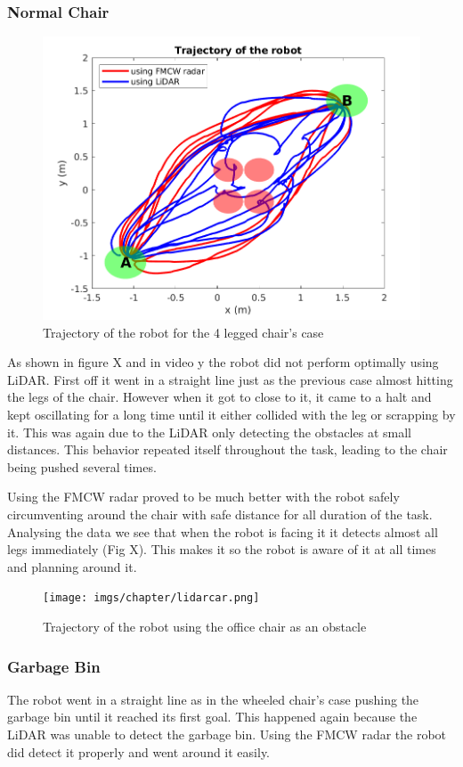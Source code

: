 \subsubsection{Normal Chair}
\begin{figure}
\centerline{\includegraphics [width=0.7 \textwidth]{imgs/chapter5/traj2.png}}
\caption{Trajectory of the robot for the 4 legged chair's case}
\label{fig:turlebot2}
\end{figure}
As shown in figure X and in video y the robot did not perform optimally using \ac{LiDAR}. First off it went in a straight line just as the previous case almost hitting  the legs of the chair. However when it got to close to it, it came to a halt and kept oscillating for a long time until it either collided with the leg or scrapping by it. This was again due to the \ac{LiDAR} only detecting the obstacles at small distances. This behavior repeated itself throughout the task, leading to the chair being pushed several times. 

Using the \ac{FMCW} radar proved to be much better with the robot safely circumventing around the chair with safe distance for all duration of the task. Analysing the data we see that when the robot is facing it it detects almost all legs immediately (Fig X). This makes it so the robot is aware of it at all times and planning around it.
\begin{figure}[h] 
\centerline{\texttt{[image: imgs/chapter/lidarcar.png]}}
\caption{Trajectory of the robot using the office chair as an obstacle}
\label{fig:lidarcar}
\end{figure}

\subsubsection{Garbage Bin}
The robot went in a straight line as in the wheeled chair's case pushing the garbage bin until it reached its first goal. This happened again because the \ac{LiDAR} was unable to detect the garbage bin. Using the \ac{FMCW} radar the robot did detect it properly and went around it easily.
